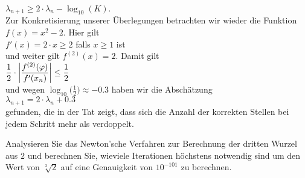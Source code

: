 \\[0.2cm]
\hspace*{1.3cm}
$\lambda_{n+1} \geq 2 \cdot \lambda_n - \log_{10}(K)$.
\\[0.2cm]
Zur Konkretisierung unserer \"Uberlegungen betrachten wir wieder die Funktion $f(x) = x^2 -2$.  Hier gilt
\\[0.2cm]
\hspace*{1.3cm}
$f'(x) = 2 \cdot x \geq 2$ \quad falls $x \geq 1$ ist
\\[0.2cm]
und weiter gilt $f^{(2)}(x) = 2$.  Damit gilt
\\[0.2cm]
\hspace*{1.3cm}
$\displaystyle \frac{1}{2} \cdot \left|\frac{f^{(2)}(\varphi)}{f'(x_n)}\right| \leq \frac{1}{2}$
\\[0.2cm]
und wegen $\log_{10}\bigl(\frac{1}{2}\bigr) \approx - 0.3$ haben wir die Absch\"atzung
\\[0.2cm]
\hspace*{1.3cm}
$\lambda_{n+1} = 2 \cdot \lambda_{n} + 0.3$ 
\\[0.2cm]
gefunden, die in der Tat zeigt, dass sich die Anzahl der korrekten Stellen bei jedem Schritt mehr als verdoppelt.
\pagebreak

\exercise
Analysieren Sie das Newton'sche Verfahren zur Berechnung der dritten Wurzel aus $2$ und berechnen Sie,
wieviele Iterationen h\"ochstens notwendig sind um den Wert von $\sqrt[3]{2}$ auf eine Genauigkeit von
$10^{-101}$ zu berechnen.
\eox





